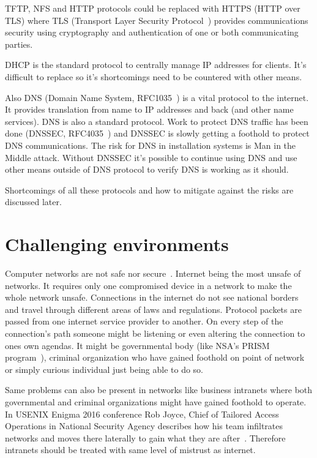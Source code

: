 TFTP, NFS and HTTP protocols could be replaced with HTTPS (HTTP over
TLS) where TLS (Transport Layer Security Protocol~\cite{RFC5246})
provides communications security using cryptography and authentication
of one or both communicating parties.

DHCP is the standard protocol to centrally manage IP addresses for
clients. It's difficult to replace so it's shortcomings need to be
countered with other means.

Also DNS (Domain Name System, RFC1035~\cite{rfc1035}) is a vital
protocol to the internet. It provides translation from name to IP
addresses and back (and other name services). DNS is also a standard
protocol. Work to protect DNS traffic has been done (DNSSEC,
RFC4035~\cite{rfc4035}) and DNSSEC is slowly getting a foothold to
protect DNS communications. The risk for DNS in installation systems
is Man in the Middle attack. Without DNSSEC it's possible to continue
using DNS and use other means outside of DNS protocol to verify DNS is
working as it should.

Shortcomings of all these protocols and how to mitigate against the
risks are discussed later.

\section{Challenging environments}

Computer networks are not safe nor secure~\cite{beyondcorp}. Internet
being the most unsafe of networks. It requires only one compromised
device in a network to make the whole network unsafe. Connections in
the internet do not see national borders and travel through different
areas of laws and regulations. Protocol packets are passed from one
internet service provider to another. On every step of the
connection's path someone might be listening or even altering the
connection to ones own agendas. It might be governmental body (like
NSA's PRISM program~\cite{nsa-prism}), criminal organization who have
gained foothold on point of network or simply curious individual just
being able to do so.

Same problems can also be present in networks like business intranets
where both governmental and criminal organizations might have gained
foothold to operate. In USENIX Enigma 2016 conference Rob Joyce, Chief
of Tailored Access Operations in National Security Agency describes
how his team infiltrates networks and moves there laterally to gain
what they are after~\cite{nsa-tao}. Therefore intranets should be
treated with same level of mistrust as internet.


